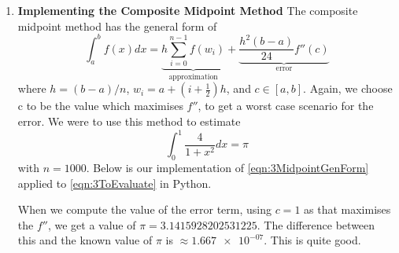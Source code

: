 \documentclass[12pt]{article}
\begin{document}
\begin{enumerate}
        \item \textbf{Implementing the Composite Midpoint Method} \newline
        The composite midpoint method has the general form of 
        \begin{equation}
            \int_a^b f(x)dx = \underbrace{h\sum_{i=0}^{n-1}f(w_i)}_\text{approximation}
            +\underbrace{\frac{h^2(b-a)}{24}f''(c)}_\text{error}
            \label{eqn:3MidpointGenForm}
        \end{equation}
        where $h=(b-a)/n$, $w_i=a+(i+\frac{1}{2})h$, and $c\in[a,b]$. Again, we choose c to be 
        the value which maximises $f''$, to get a worst case scenario for the error. We were to use 
        this method to estimate 
        \begin{equation}
            \int_0^1 \frac{4}{1+x^2}dx = \pi
            \label{eqn:3ToEvaluate}
        \end{equation}
        with $n=1000$. Below is our implementation of \autoref{eqn:3MidpointGenForm} applied to 
        \autoref{eqn:3ToEvaluate} in Python.
        \newline
        
        
        When we compute the value of the error term, using $c=1$ as that maximises the $f''$, 
        we get a value of $\pi = 3.1415928202531225$. The difference between this and the known 
        value of $\pi$ is $\approx\num{1.667e-07}$. This is quite good. 
    \end{enumerate}
\end{document}
